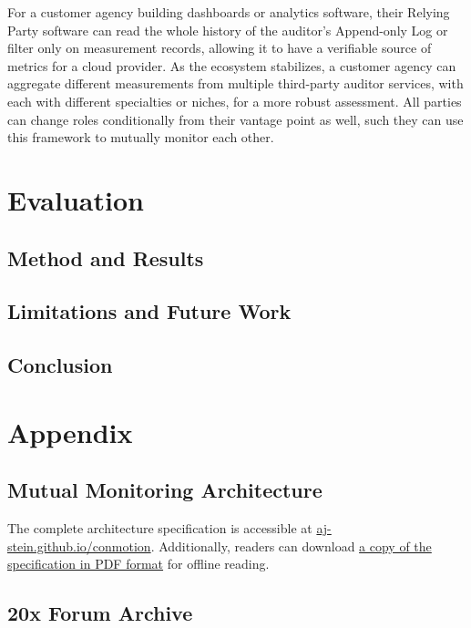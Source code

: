 \documentclass{jdf}
\begin{document}
For a customer agency building dashboards or analytics software, their Relying Party software can read the whole history of the auditor's Append-only Log or filter only on measurement records, allowing it to have a verifiable source of metrics for a cloud provider. As the ecosystem stabilizes, a customer agency can aggregate different measurements from multiple third-party auditor services, with each with different specialties or niches, for a more robust assessment. All parties can change roles conditionally from their vantage point as well, such they can use this framework to mutually monitor each other.

\section{Evaluation}

\subsection{Method and Results}

\subsection{Limitations and Future Work}

\subsection{Conclusion}




\section{Appendix}

\subsection{Mutual Monitoring Architecture} \label{architecture}

The complete architecture specification is accessible at \href{https://aj-stein.github.io/conmotion/architecture.html}{aj-stein.github.io/conmotion}. Additionally, readers can download \href{https://aj-stein.github.io/conmotion/architecture.pdf}{a copy of the specification in PDF format} for offline reading.

\subsection{20x Forum Archive} \label{20x_archive}
\end{document}
